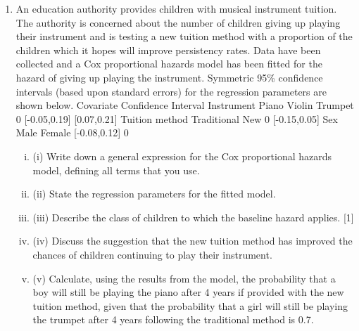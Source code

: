 \documentclass[a4paper,12pt]{article}
\begin{document}
\begin{enumerate}
\item %
An education authority provides children with musical instrument tuition. The
authority is concerned about the number of children giving up playing their
instrument and is testing a new tuition method with a proportion of the children which
it hopes will improve persistency rates. Data have been collected and a Cox
proportional hazards model has been fitted for the hazard of giving up playing the
instrument. Symmetric 95\% confidence intervals (based upon standard errors) for the
regression parameters are shown below.
Covariate
Confidence Interval
Instrument
Piano
Violin
Trumpet 0
[-0.05,0.19]
[0.07,0.21]
Tuition method
Traditional
New 0
[-0.15,0.05]
Sex
Male
Female
[-0.08,0.12]
0

\begin{enumerate}[(i)]
\item (i) Write down a general expression for the Cox proportional hazards model,
defining all terms that you use.

\item (ii) State the regression parameters for the fitted model. 
\item (iii) Describe the class of children to which the baseline hazard applies. [1]
\item (iv) Discuss the suggestion that the new tuition method has improved the chances
of children continuing to play their instrument.
\item 
(v) Calculate, using the results from the model, the probability that a boy will still
be playing the piano after 4 years if provided with the new tuition method,
given that the probability that a girl will still be playing the trumpet after 4
years following the traditional method is 0.7.

\end{enumerate}

\newpage


\end{enumerate}
\end{document}

